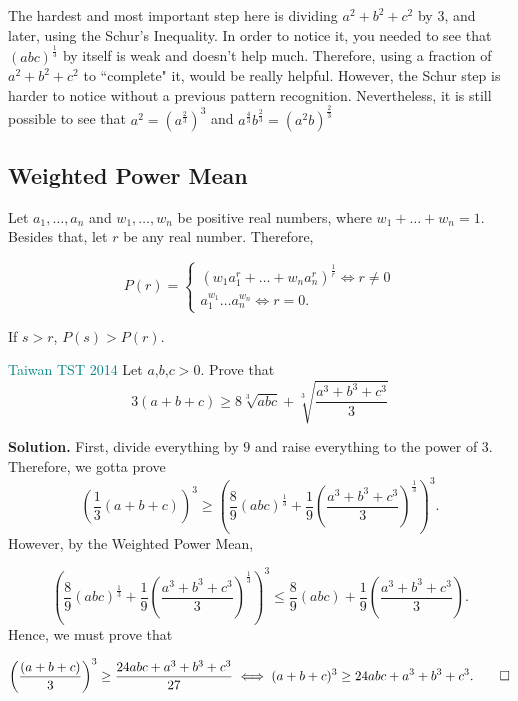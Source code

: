 \begin{insight}
	The hardest and most important step here is dividing $a^2+b^2+c^2$ by $3$, and
	later, using the Schur's Inequality. In order to notice it, you needed to see
	that $(abc)^{\frac{1}{3}}$ by itself is weak and doesn't help much. Therefore,
	using a fraction of $a^2+b^2+c^2$ to ``complete" it, would be really helpful.
	However, the Schur step is harder to notice without a previous pattern
	recognition. Nevertheless, it is still possible to see that
	$a^2=(a^{\frac{2}{3}})^3$ and $a^{\frac{4}{3}}b^{\frac{2}{3}} = (a^2b)^{\frac{2}{3}}$
\end{insight}

\clearpage

\subsection{\textsf{Weighted Power Mean}}

Let $a_1, \dots, a_n$ and $w_1,\dots,w_n$ be positive real numbers, where $w_1+\dots+w_n=1$.
Besides that, let $r$ be any real number. Therefore,

\[
	P(r) =
	\begin{cases}
		(w_1a^r_1+\dots+w_na_n^r)^{\frac{1}{r}} \iff r \neq 0 \\
		a_1^{w_1}\dots a_n^{w_n} \iff r =0.
	\end{cases}
\]

If $s>r$, $P(s)>P(r)$.

\begin{example}{\textcolor{teal}{Taiwan TST 2014}}{}
	Let $a$,$b$,$c >0$. Prove that
	\[
		3(a+b+c) \ge 8\sqrt[3]{abc} + \sqrt[3]{\frac{a^3+b^3+c^3}{3}}
	\]
\end{example}
\textbf{\textcolor{color2}{Solution.}} First, divide everything by $9$ and raise everything to
the power of $3$. Therefore, we gotta prove
\[
	\left(\frac{1}{3}(a+b+c)\right)^3 \ge \left(\frac{8}{9}(abc)^{\frac{1}{3}}+\frac{1}{9}\left(\frac{a^3+b^3+c^3}{3}\right)^
	{\frac{1}{3}}\right)^3.
\]
However, by the Weighted Power Mean,

\[
	\left(\frac{8}{9}(abc)^{\frac{1}{3}}+\frac{1}{9}\left(\frac{a^3+b^3+c^3}{3}\right)^{\frac{1}{3}}\right)^3 \le
	\frac{8}{9}(abc)+\frac{1}{9}\left(\frac{a^3+b^3+c^3}{3}\right).
\]
Hence, we must prove that

\[
	\left(\frac{(a+b+c)}{3}\right)^3 \ge \frac{24abc+a^3+b^3+c^3}{27} \iff (a+b+c)^3 \ge 24abc+a^3+b^3+c^3. \qed
\]

\clearpage


